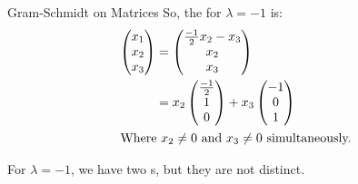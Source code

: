 \begin{example}{Gram-Schmidt on Matrices}
  So, the  for $\lambda = -1$ is:
  \begin{align*}
    \begin{pmatrix}
      x_{1} \\ x_{2} \\ x_{3}
    \end{pmatrix} &=
                    \begin{pmatrix}
                      \frac{-1}{2} x_{2} - x_{3} \\ x_{2} \\ x_{3}
                    \end{pmatrix} \\
    &= x_{2}
      \begin{pmatrix}
        \frac{-1}{2} \\ 1 \\ 0
      \end{pmatrix} + x_{3}
    \begin{pmatrix}
      -1 \\ 0 \\ 1
    \end{pmatrix} \\
    \intertext{Where $x_{2} \neq 0$ and $x_{3} \neq 0$ simultaneously.}
  \end{align*}

  For $\lambda = -1$, we have two s, but they are not distinct.


\end{example}
